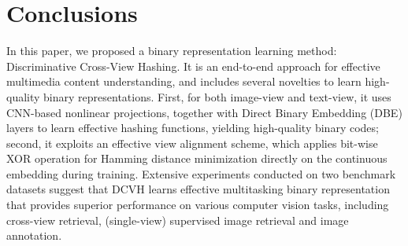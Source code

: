 \documentclass[10pt,twocolumn,letterpaper]{article}
\begin{document}
\section{Conclusions}\label{sec:con}
In this paper, we proposed a binary representation learning method: Discriminative Cross-View Hashing. It is an end-to-end approach for effective multimedia content understanding, and includes several novelties to learn high-quality binary representations. First, for both image-view and text-view, it uses CNN-based nonlinear projections, together with Direct Binary Embedding (DBE) layers to learn effective hashing functions, yielding high-quality binary codes; second, it exploits an effective view alignment scheme, which applies bit-wise XOR operation for Hamming distance minimization directly on the continuous embedding during training. Extensive experiments conducted on two benchmark datasets suggest that DCVH learns effective multitasking binary representation that provides superior performance on various computer vision tasks, including cross-view retrieval, (single-view) supervised image retrieval and image annotation.


{\small


}
\end{document}
